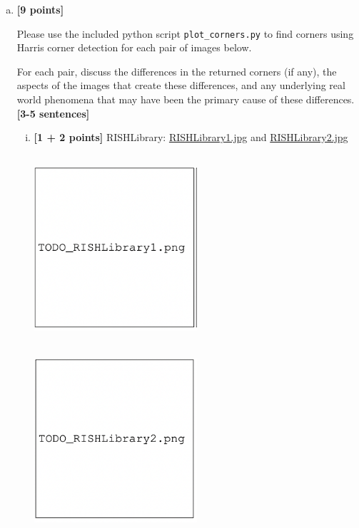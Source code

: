 \documentclass[11pt]{article}
\begin{document}
\begin{enumerate}[(a)]
    \item \textbf{[9 points]}

    \begin{tcolorbox}[colback=orange!5!white,colframe=orange!75!black]
    Please use the included python script \texttt{plot\_corners.py} to find corners using Harris corner detection for each pair of images below. 

    For each pair, discuss the differences in the returned corners (if any), the aspects of the images that create these differences, and any underlying real world phenomena that may have been the primary cause of these differences. \textbf{[3-5 sentences]}
    \end{tcolorbox}

    \begin{enumerate}[(i)]
        \item \textbf{[1 + 2 points]}
        RISHLibrary: 
        \href{images/RISHLibrary1.jpg}{RISHLibrary1.jpg} and \href{images/RISHLibrary2.jpg}{RISHLibrary2.jpg} 
        \begin{tcolorbox}[colback=white!5!white,colframe=green!75!black,breakable]
        \includegraphics[width=0.5\textwidth,height=7cm,keepaspectratio]{images/TODO_RishLibrary1.png}
        \includegraphics[width=0.5\textwidth,height=7cm,keepaspectratio]{images/TODO_RishLibrary2.png}


\end{tcolorbox}
\end{enumerate}
\end{enumerate}
\end{document}
